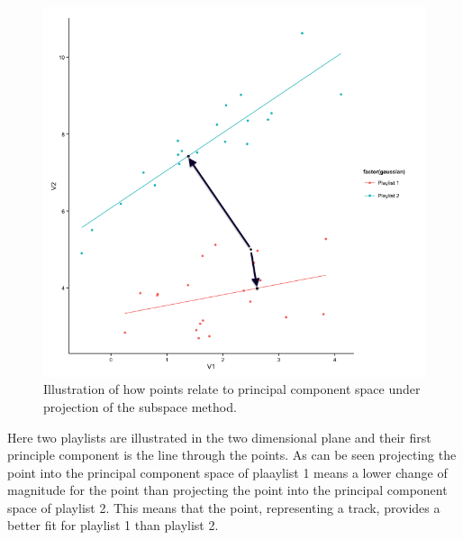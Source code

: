 \documentclass[a4paper,11pt]{kth-mag}
\begin{document}
\begin{figure}
\includegraphics[scale=0.6]{images/subspaceIllustrationBW0.png}
\caption{Illustration of how points relate to principal component space under projection of the subspace method.}
\end{figure}


Here two playlists are illustrated in the two dimensional plane and their first principle component is the line through the points. As can be seen projecting the point into the principal component space of plaaylist 1 means a lower change of magnitude for the point than projecting the point into the principal component space of playlist 2. This means that the point, representing a track, provides a better fit for playlist 1 than playlist 2.
\end{document}
